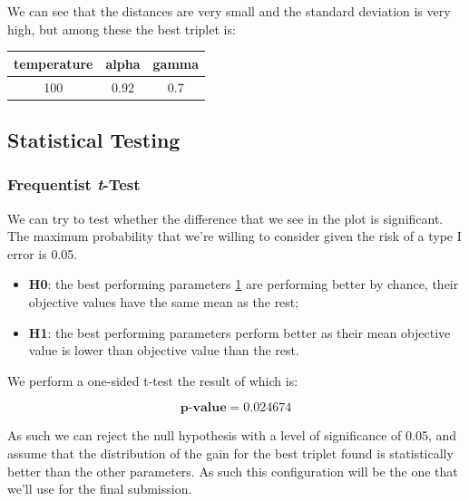 \documentclass[a4paper,12pt]{article}
\begin{document}
We can see that the distances are very small and the standard deviation is very high, but among these the best triplet is:

\begin{table}[h]
    \centering
    \begin{tabular}{|c | c| c|}
        temperature & alpha & gamma\\ \hline
        100 & 0.92 & 0.7\\
    \end{tabular}
    \label{tab:best_params}
\end{table}


\subsection*{Statistical Testing}
\subsubsection*{Frequentist \textit{t}-Test}
We can try to test whether the difference that we see in the plot is significant. The maximum probability that we're willing to consider given the risk of a type I error is 0.05. 
\begin{itemize}
    \item \textbf{H0}: the best performing parameters \ref{tab:best_params} are performing better by chance, their objective values have the same mean as the rest;
    \item \textbf{H1}: the best performing parameters perform better as their mean objective value is lower than objective value than the rest.
\end{itemize}
We perform a one-sided t-test the result of which is:

$$\textbf{p-value} = 0.024674$$

As such we can reject the null hypothesis with a level of significance of 0.05, and assume that the distribution of the gain for the best triplet found is statistically better than the other parameters. As such this configuration will be the one that we'll use for the final submission.
\end{document}
